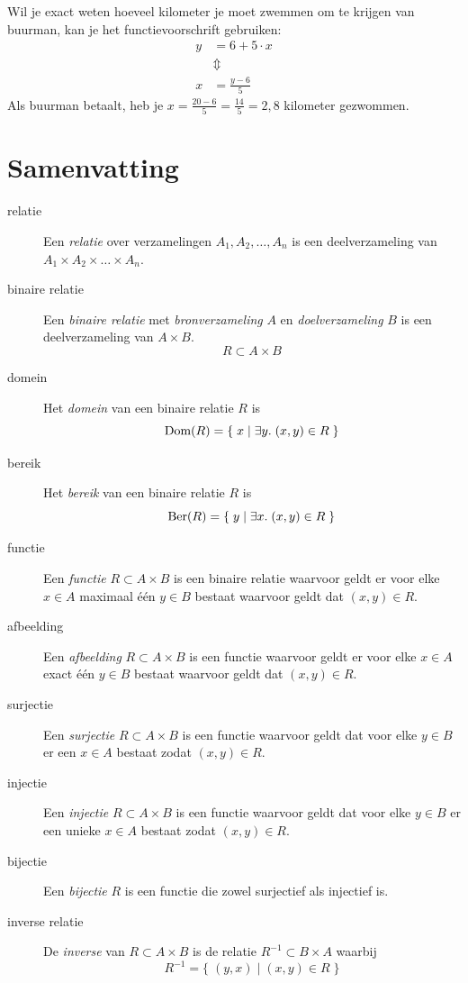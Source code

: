 Wil je exact weten hoeveel kilometer je moet zwemmen om  te krijgen van buurman, kan je het functievoorschrift gebruiken:
\[
\begin{split}
y&=6+5\cdot x\\
& \Updownarrow\\
x&=\frac{y-6}{5}
\end{split}
\]
Als buurman  betaalt, heb je $x=\frac{20-6}{5}=\frac{14}{5}=2,8$ kilometer gezwommen.

\section{Samenvatting}
\begin{description}
  \item[relatie] Een \emph{relatie} over verzamelingen $A_1, A_2, \dots, A_n$ is een deelverzameling van $A_1 \times A_2 \times \dots \times A_n$.
  \item[binaire relatie] Een \emph{binaire relatie} met \emph{bronverzameling} $A$ en \emph{doelverzameling} $B$ is een deelverzameling van $A \times B$.
    \[ R \subset A \times B \]
  \item[domein] Het \emph{domein} van een binaire relatie $R$ is
    \[ \text{Dom}(R) = \{ \; x \;|\; \exists y. \; (x, y) \in R \; \} \]
  \item[bereik] Het \emph{bereik} van een binaire relatie $R$ is
    \[ \text{Ber}(R) = \{ \; y \;|\; \exists x. \; (x, y) \in R \; \} \]
  \item[functie] Een \emph{functie} $R \subset A \times B$ is een binaire relatie waarvoor geldt er voor elke $x \in A$ maximaal \'e\'en $y \in B$ bestaat waarvoor geldt dat $(x,y) \in R$.
  \item[afbeelding] Een \emph{afbeelding} $R \subset A \times B$ is een functie waarvoor geldt er voor elke $x \in A$ exact \'e\'en $y \in B$ bestaat waarvoor geldt dat $(x, y) \in R$.
  \item[surjectie] Een \emph{surjectie} $R \subset A \times B$ is een functie waarvoor geldt dat voor elke $y \in B$ er een $x \in A$ bestaat zodat $(x, y) \in R$.
  \item[injectie] Een \emph{injectie} $R \subset A \times B$ is een functie waarvoor geldt dat voor elke $y \in B$ er een unieke $x \in A$ bestaat zodat $(x, y) \in R$.
  \item[bijectie] Een \emph{bijectie} $R$ is een functie die zowel surjectief als injectief is.
  \item[inverse relatie] De \emph{inverse} van $R \subset A \times B$ is de relatie $R^{-1} \subset B \times A$ waarbij
    \[ R^{-1} = \{ \; (y, x) \;|\; (x, y) \in R \; \} \]
\end{description}



